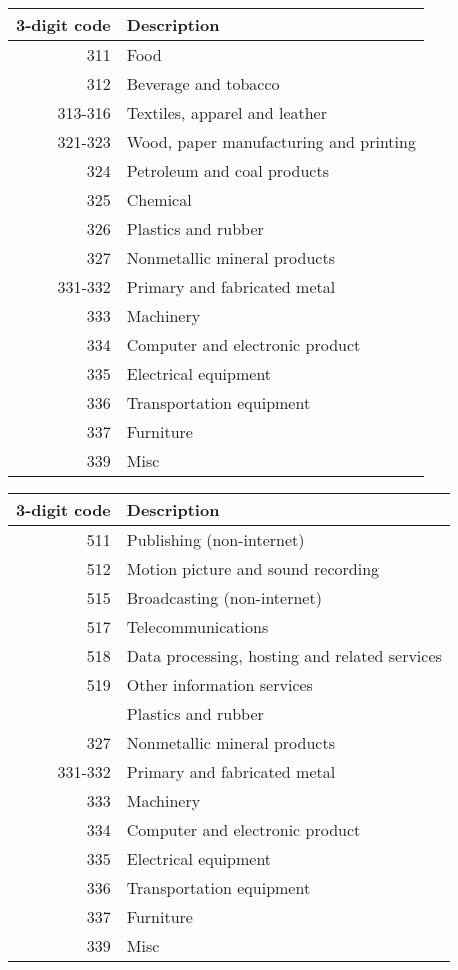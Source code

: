 \documentclass[11pt,english]{article}
\begin{document}
\begin{table}[]
	\centering
	\label{}
	\begin{tabular}{rl}
		\toprule \toprule
		3-digit code & Description \tabularnewline
		\midrule
		311 & Food \tabularnewline 
		312 & Beverage and tobacco  \tabularnewline 
		313-316 & Textiles, apparel and leather  \tabularnewline
		321-323 & Wood, paper manufacturing and printing \tabularnewline  
		324 & Petroleum and coal products \tabularnewline
		325 & Chemical \tabularnewline
		326 & Plastics and rubber \tabularnewline
		327 & Nonmetallic mineral products \tabularnewline 
		331-332 & Primary and fabricated metal  \tabularnewline
		333 & Machinery \tabularnewline
		334 & Computer and electronic product \tabularnewline
		335 & Electrical equipment \tabularnewline
		336 & Transportation equipment \tabularnewline
		337 & Furniture \tabularnewline
		339 & Misc \tabularnewline
		\bottomrule
	\end{tabular}
\end{table}

\begin{table}[]
	\centering
	\label{}
	\begin{tabular}{rl}
		\toprule \toprule
		3-digit code & Description \tabularnewline
		\midrule
		511 & Publishing (non-internet) \tabularnewline 
		512 & Motion picture and sound recording \tabularnewline 
		515 & Broadcasting (non-internet) \tabularnewline
		517 & Telecommunications \tabularnewline  
		518 & Data processing, hosting and related services \tabularnewline
		519 & Other information services \tabularnewline
		 & Plastics and rubber \tabularnewline
		327 & Nonmetallic mineral products \tabularnewline 
		331-332 & Primary and fabricated metal  \tabularnewline
		333 & Machinery \tabularnewline
		334 & Computer and electronic product \tabularnewline
		335 & Electrical equipment \tabularnewline
		336 & Transportation equipment \tabularnewline
		337 & Furniture \tabularnewline
		339 & Misc \tabularnewline
		\bottomrule
	\end{tabular}
\end{table}
\end{document}
